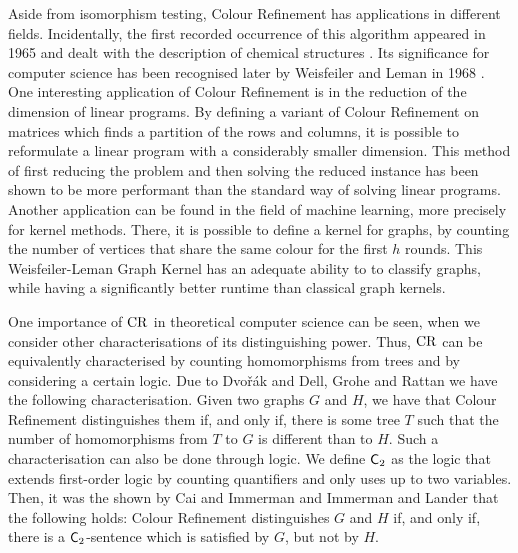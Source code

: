 Aside from isomorphism testing, Colour Refinement has applications in different fields.
Incidentally, the first recorded occurrence of this algorithm appeared in 1965 and dealt with the description of chemical structures \cite{morgan1965GenerationUnique}.
Its significance for computer science has been recognised later by Weisfeiler and Leman in 1968 \cite{weisfeiler1968reduction}.
One interesting application of Colour Refinement is in the reduction of the dimension of linear programs.
By defining a variant of Colour Refinement on matrices which finds a partition of the rows and columns, it is possible to reformulate a linear program with a considerably smaller dimension.
This method of first reducing the problem and then solving the reduced instance has been shown to be more performant than the standard way of solving linear programs. \cite{grohe2014DimensionReduction}
Another application can be found in the field of machine learning, more precisely for kernel methods.
There, it is possible to define a kernel for graphs, by counting the number of vertices that share the same colour for the first $h$ rounds.
This Weisfeiler-Leman Graph Kernel has an adequate ability to to classify graphs, while having a significantly better runtime than classical graph kernels. \cite{grohe2021ColorRefinement}

One importance of $\operatorname{CR}$ in theoretical computer science can be seen, when  we consider other characterisations of its distinguishing power.
Thus, $\operatorname{CR}$ can be equivalently characterised by counting homomorphisms from trees and by considering a certain logic.
Due to Dvo\v r\'ak \cite{dvorak2010RecognizingGraphsa} and Dell, Grohe and Rattan \cite{dell2018LovaszMeets} we have the following characterisation.
Given two graphs $G$ and $H$, we have that Colour Refinement distinguishes them if, and only if, there is some tree $T$ such that the number of homomorphisms from $T$ to $G$ is different than to $H$.
Such a characterisation can also be done through logic.
We define $\mathsf{C}_{2}$ as the logic that extends first-order logic by counting quantifiers and only uses up to two variables.
Then, it was the shown by Cai and Immerman \cite{cai1992OptimalLower} and Immerman and Lander \cite{immerman1990DescribingGraphs} that the following holds: 
Colour Refinement distinguishes $G$ and $H$ if, and only if, there is a $\mathsf{C}_{2}$-sentence which is satisfied by $G$, but not by $H$.


